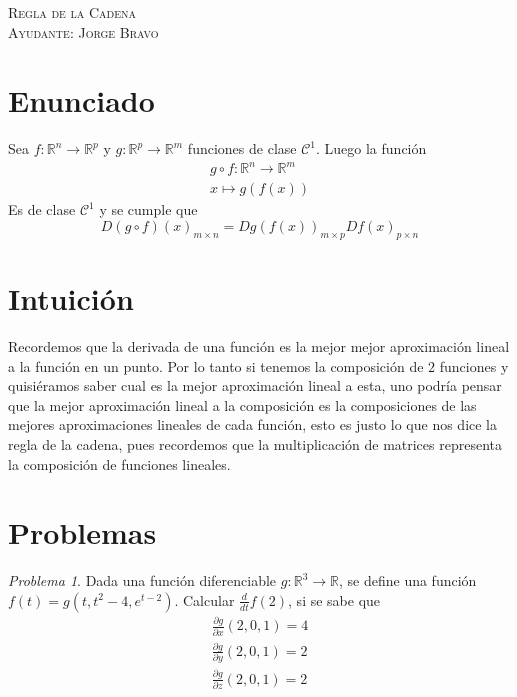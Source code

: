 \documentclass[a4paper,oneside,10.5pt]{article}
\newcommand\RR{\mathbb{R}}
\theoremstyle{definition}
\theoremstyle{plain}
\theoremstyle{remark}
\theoremstyle{theorem}
\newtheorem{prob}{Problema}
\begin{document}
\begin{center}
{\Large \textsc{Regla de la Cadena}}\\
\vspace{1em}
\textsc{Ayudante: Jorge Bravo}\\
\end{center}

\section*{Enunciado}
 Sea $f: \RR^{n} \to \RR^p$ y $g: \RR^p \to \RR^m$ funciones de clase $\mathcal{C}^1$. Luego la función
\begin{gather*}
    g \circ f : \RR^n \to \RR^m\\
    x \mapsto g(f(x))
\end{gather*}
Es de clase $\mathcal{C}^1$ y se cumple que
\begin{equation*}
    D(g \circ f)(x)_{m \times n} = Dg(f(x))_{m \times p} Df(x)_{p \times n}
\end{equation*}

\section*{Intuici\'on}
Recordemos que la derivada de una función es la mejor mejor aproximación lineal a la función en un punto. Por lo tanto si tenemos la composición de $2$ funciones y quisiéramos saber cual es la mejor aproximación lineal a esta, uno podría pensar que la mejor aproximación lineal a la composición es la composiciones de las mejores aproximaciones lineales de cada función, esto es justo lo que nos dice la regla de la cadena, pues recordemos que la multiplicación de matrices representa la composición de funciones lineales.

\section*{Problemas}

\begin{prob}
    Dada una función diferenciable $g: \RR^3 \to \RR$, se define una función $f(t) = g(t, t^2 - 4, e^{t - 2})$. Calcular $\frac{d}{dt}f(2)$, si se sabe que
    \begin{gather*}
      \frac{\partial g}{\partial x}(2, 0, 1) = 4\\
      \frac{\partial g}{\partial y}(2, 0, 1) = 2\\
      \frac{\partial g}{\partial z}(2, 0, 1) = 2
    \end{gather*}
\end{prob}
\end{document}
